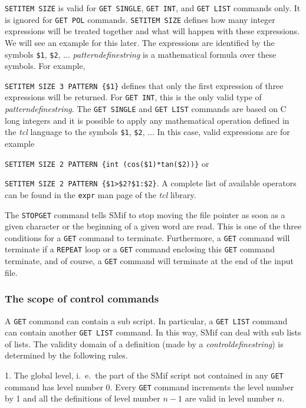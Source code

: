 \documentclass{article}
\begin{document}
\texttt{SETITEM SIZE} is valid for \texttt{GET SINGLE}, \texttt{GET
  INT}, and \texttt{GET LIST} commands only. It is ignored for
\texttt{GET POL} commands. \texttt{SETITEM SIZE} defines how many
integer expressions will be treated together and what will happen with
these expressions.  We will see an example for this later. The
expressions are identified by the symbols \texttt{\$1}, \texttt{\$2},
...  \emph{patterndefinestring} is a mathematical formula over these
symbols.  For example,

\texttt{SETITEM SIZE 3 PATTERN \{\$1\}} \newline defines that only the
first expression of three expressions will be returned.  For
\texttt{GET INT}, this is the only valid type of
\emph{patterndefinestring}. The \texttt{GET SINGLE} and \texttt{GET
  LIST} commands are based on C long integers and it is possible to
apply any mathematical operation defined in the \emph{tcl} language to
the symbols \texttt{\$1}, \texttt{\$2}, ... In this case, valid
expressions are for example

\texttt{SETITEM SIZE 2 PATTERN \{int (cos(\$1)*tan(\$2))\}} \newline
or

\texttt{SETITEM SIZE 2 PATTERN \{\$1>\$2?\$1:\$2\}}.  \newline A
complete list of available operators can be found in the \texttt{expr}
man page of the \emph{tcl} library.

The \texttt{STOPGET} command tells SMif to stop moving the file
pointer as soon as a given character or the beginning of a given word
are read. This is one of the three conditions for a \texttt{GET}
command to terminate.  Furthermore, a \texttt{GET} command will
terminate if a \texttt{REPEAT} loop or a \texttt{GET} command
enclosing this \texttt{GET} command terminate, and of course, a
\texttt{GET} command will terminate at the end of the input file.

\subsubsection{The scope of control commands}

A \texttt{GET} command can contain a sub script. In particular, a
\texttt{GET LIST} command can contain another \texttt{GET LIST}
command.  In this way, SMif can deal with sub lists of lists.  The
validity domain of a definition (made by a \emph{controldefinestring})
is determined by the following rules.

1. The global level, i.\ e.\ the part of the SMif script not contained
in any \texttt{GET} command has level number 0.  Every \texttt{GET}
command increments the level number by 1 and all the definitions of
level number $n - 1$ are valid in level number $n$.
\end{document}
